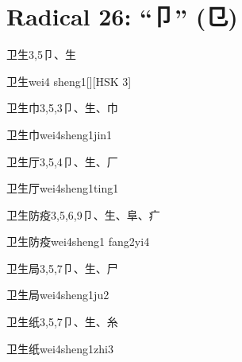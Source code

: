 
\section*{Radical 26: ``⼙'' (㔾)}

\begin{entry}{卫生}{3,5}{⼙、⽣}
  \begin{phonetics}{卫生}{wei4 sheng1}[][HSK 3]
  \end{phonetics}
\end{entry}

\begin{entry}{卫生巾}{3,5,3}{⼙、⽣、⼱}
  \begin{phonetics}{卫生巾}{wei4sheng1jin1}
  \end{phonetics}
\end{entry}

\begin{entry}{卫生厅}{3,5,4}{⼙、⽣、⼚}
  \begin{phonetics}{卫生厅}{wei4sheng1ting1}
  \end{phonetics}
\end{entry}

\begin{entry}{卫生防疫}{3,5,6,9}{⼙、⽣、⾩、⽧}
  \begin{phonetics}{卫生防疫}{wei4sheng1 fang2yi4}
  \end{phonetics}
\end{entry}

\begin{entry}{卫生局}{3,5,7}{⼙、⽣、⼫}
  \begin{phonetics}{卫生局}{wei4sheng1ju2}
  \end{phonetics}
\end{entry}

\begin{entry}{卫生纸}{3,5,7}{⼙、⽣、⽷}
  \begin{phonetics}{卫生纸}{wei4sheng1zhi3}
  \end{phonetics}
\end{entry}

